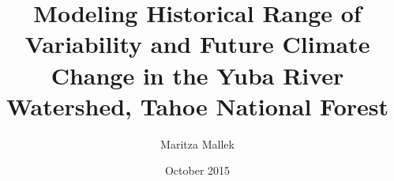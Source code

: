 \documentclass[12pt]{book}
\begin{document}
\author{Maritza Mallek}
\title{Modeling Historical Range of Variability and Future Climate Change in the Yuba River Watershed, Tahoe National Forest}
\date{October 2015}



\maketitle
\frontmatter 
\tableofcontents 
%

\mainmatter 

 
 
 


%
%
%
%
%
%

\backmatter 
% 
% 
\end{document}
